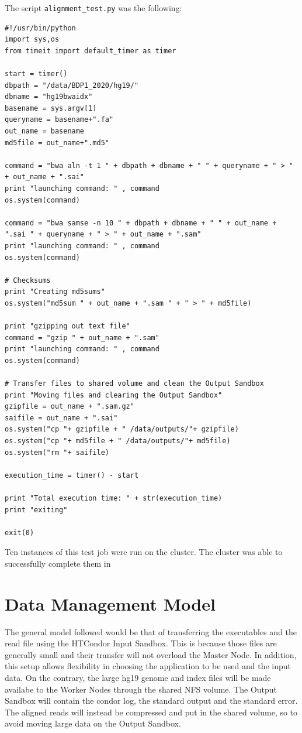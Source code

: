 \documentclass{article}
\begin{document}
The script \texttt{alignment\_test.py} was the following:

\begin{lstlisting}
#!/usr/bin/python
import sys,os
from timeit import default_timer as timer

start = timer()
dbpath = "/data/BDP1_2020/hg19/"
dbname = "hg19bwaidx"
basename = sys.argv[1]
queryname = basename+".fa"
out_name = basename 
md5file = out_name+".md5"

command = "bwa aln -t 1 " + dbpath + dbname + " " + queryname + " > " + out_name + ".sai"
print "launching command: " , command
os.system(command)

command = "bwa samse -n 10 " + dbpath + dbname + " " + out_name + ".sai " + queryname + " > " + out_name + ".sam"
print "launching command: " , command
os.system(command)

# Checksums
print "Creating md5sums"
os.system("md5sum " + out_name + ".sam " + " > " + md5file)

print "gzipping out text file"
command = "gzip " + out_name + ".sam"
print "launching command: " , command
os.system(command)

# Transfer files to shared volume and clean the Output Sandbox
print "Moving files and clearing the Output Sandbox"
gzipfile = out_name + ".sam.gz"
saifile = out_name + ".sai"
os.system("cp "+ gzipfile + " /data/outputs/"+ gzipfile)
os.system("cp "+ md5file + " /data/outputs/"+ md5file)
os.system("rm "+ saifile)

execution_time = timer() - start

print "Total execution time: " + str(execution_time)
print "exiting"

exit(0)
\end{lstlisting}

Ten instances of this test job were run on the cluster.
The cluster was able to successfully complete them in 

\section{Data Management Model}
The general model followed would be that of transferring the executables and the read file using the HTCondor Input Sandbox.
This is because those files are generally small and their transfer will not overload the Master Node.
In addition, this setup allows flexibility in choosing the application to be used and the input data.
On the contrary, the large hg19 genome and index files will be made availabe to the Worker Nodes through the shared NFS volume.
The Output Sandbox will contain the condor log, the standard output and the standard error.
The aligned reads will instead be compressed and put in the shared volume, so to avoid moving large data on the Output Sandbox.
\end{document}
